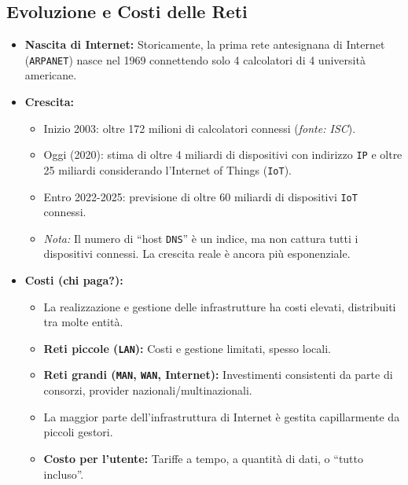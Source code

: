 \subsection{Evoluzione e Costi delle Reti}
\begin{itemize}
    \item \textbf{Nascita di Internet:} Storicamente, la prima rete antesignana di Internet (\texttt{ARPANET}) nasce nel 1969 connettendo solo 4 calcolatori di 4 università americane.
    \item \textbf{Crescita:}
    \begin{itemize}
        \item Inizio 2003: oltre 172 milioni di calcolatori connessi (\textit{fonte: ISC}).
        \item Oggi (2020): stima di oltre 4 miliardi di dispositivi con indirizzo \texttt{IP} e oltre 25 miliardi considerando l'Internet of Things (\texttt{IoT}).
        \item Entro 2022-2025: previsione di oltre 60 miliardi di dispositivi \texttt{IoT} connessi.
        \item \textit{Nota:} Il numero di “host \texttt{DNS}” è un indice, ma non cattura tutti i dispositivi connessi. La crescita reale è ancora più esponenziale.
    \end{itemize}
    \item \textbf{Costi (chi paga?):}
    \begin{itemize}
        \item La realizzazione e gestione delle infrastrutture ha costi elevati, distribuiti tra molte entità.
        \item \textbf{Reti piccole (\texttt{LAN}):} Costi e gestione limitati, spesso locali.
        \item \textbf{Reti grandi (\texttt{MAN}, \texttt{WAN}, Internet):} Investimenti consistenti da parte di consorzi, provider nazionali/multinazionali.
        \item La maggior parte dell'infrastruttura di Internet è gestita capillarmente da piccoli gestori.
        \item \textbf{Costo per l'utente:} Tariffe a tempo, a quantità di dati, o “tutto incluso”.
    \end{itemize}
\end{itemize}


